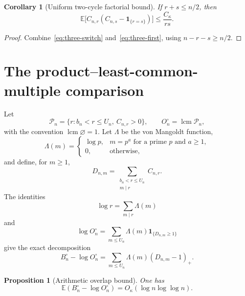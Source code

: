 \documentclass[11pt]{article}
\newtheorem{proposition}[theorem]{Proposition}
\newtheorem{corollary}[theorem]{Corollary}
\theoremstyle{remark}
\newcommand{\Ee}{\mathbb E}
\newcommand{\one}{\mathbf 1}
\newcommand{\lcm}{\operatorname{lcm}}
\begin{document}
\begin{corollary}[Uniform two-cycle factorial bound]\label{cor:pair}
If $r+s\leq n/2$, then
\begin{equation}\label{eq:pair}
 \Ee\bigl[C_{n,r}(C_{n,s}-\one_{\{r=s\}})\bigr]
 \leq\frac{C_\kappa}{rs}.
\end{equation}
\end{corollary}

\begin{proof}
Combine~\eqref{eq:three-switch} and~\eqref{eq:three-first}, using
$n-r-s\geq n/2$.
\end{proof}

\section{The product--least-common-multiple comparison}

Let
\[
 \mathcal P_n=\{r:b_n<r\leq U_n,\ C_{n,r}>0\},
 \qquad
 O_n^\circ=\lcm\mathcal P_n,
\]
with the convention $\lcm\varnothing=1$.  Let $\Lambda$ be the von
Mangoldt function,
\[
 \Lambda(m)=
 \begin{cases}
  \log p,&m=p^a\text{ for a prime }p\text{ and }a\geq1,\\
  0,&\text{otherwise},
 \end{cases}
\]
and define, for $m\geq1$,
\[
 D_{n,m}=\sum_{\substack{b_n<r\leq U_n\\m\mid r}}C_{n,r}.
\]
The identities
\[
 \log r=\sum_{m\mid r}\Lambda(m)
\]
and
\[
 \log O_n^\circ
 =\sum_{m\leq U_n}\Lambda(m)\one_{\{D_{n,m}\geq1\}}
\]
give the exact decomposition
\begin{equation}\label{eq:prod-lcm}
 B_n^\circ-\log O_n^\circ
 =\sum_{m\leq U_n}\Lambda(m)(D_{n,m}-1)_+.
\end{equation}

\begin{proposition}[Arithmetic overlap bound]\label{prop:arith}
One has
\begin{equation}\label{eq:arith-bound}
 \Ee(B_n^\circ-\log O_n^\circ)
 =O_\kappa(\log n\log\log n).
\end{equation}
\end{proposition}
\end{document}
